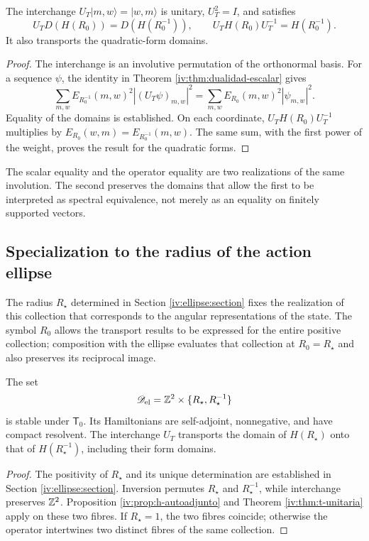\begin{theorem}
\label{iv:thm:t-unitaria}
\label{prop:dualidad-radios-k}
The interchange
\(U_T|m,w\rangle=|w,m\rangle\) is unitary,
\(U_T^2=I\), and satisfies
\begin{equation}
 U_TD(H(R_0))=D(H(R_0^{-1})),
 \qquad U_TH(R_0)U_T^{-1}=H(R_0^{-1}).
 \label{iv:eq:conjugacion-h}
\end{equation}
It also transports the quadratic-form domains.
\end{theorem}
\begin{proof}
The interchange is an involutive permutation of the
orthonormal basis. For a sequence \(\psi\), the identity in
Theorem \ref{iv:thm:dualidad-escalar} gives
\[
 \sum_{m,w}E_{R_0^{-1}}(m,w)^2|(U_T\psi)_{m,w}|^2
 =\sum_{m,w}E_{R_0}(m,w)^2|\psi_{m,w}|^2.
\]
Equality of the domains is established. On each coordinate,
\(U_TH(R_0)U_T^{-1}\) multiplies by
\(E_{R_0}(w,m)=E_{R_0^{-1}}(m,w)\). The same sum, with
the first power of the weight, proves the result for the
quadratic forms.
\end{proof}

The scalar equality and the operator equality are two realizations
of the same involution. The second preserves the domains that
allow the first to be interpreted as spectral equivalence,
not merely as an equality on finitely supported vectors.

\subsection{Specialization to the radius of the action ellipse}

The radius \(R_\star\) determined in Section
\ref{iv:ellipse:section} fixes the realization of this collection that
corresponds to the angular representations of the state. The symbol
\(R_0\) allows the transport results to be expressed for the entire
positive collection; composition with the ellipse evaluates that collection at
\(R_0=R_\star\) and also preserves its reciprocal image.

\begin{corollary}
\label{iv:cor:radio-especializado}
The set
\[
 \mathscr D_{\mathrm{el}}
 =\mathbb Z^2\times\{R_\star,R_\star^{-1}\}
\]
is stable under \(\mathsf T_0\). Its Hamiltonians are self-adjoint,
nonnegative, and have compact resolvent. The interchange \(U_T\)
transports the domain of \(H(R_\star)\) onto that of
\(H(R_\star^{-1})\), including their form domains.
\end{corollary}
\begin{proof}
The positivity of \(R_\star\) and its unique determination are established
in Section \ref{iv:ellipse:section}. Inversion permutes
\(R_\star\) and \(R_\star^{-1}\), while interchange preserves
\(\mathbb Z^2\). Proposition
\ref{iv:prop:h-autoadjunto} and Theorem \ref{iv:thm:t-unitaria}
apply on these two fibres.
If \(R_\star=1\), the two fibres coincide; otherwise
the operator intertwines two distinct fibres of the same collection.
\end{proof}

